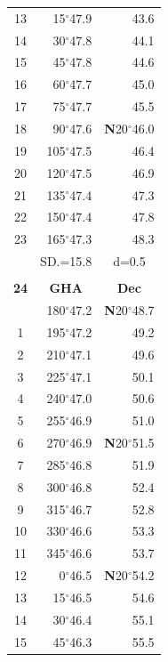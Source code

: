 \documentclass[10pt, a4paper]{report}
\begin{document}
\begin{scriptsize}
\begin{tabular*}{0.2\textwidth}[t]{@{\extracolsep{\fill}}|c|rr|}
13 & 15$^\circ$47.9 & 43.6\\
14 & 30$^\circ$47.8 & 44.1\\
15 & 45$^\circ$47.8 & \raisebox{0.24ex}{\boldmath$\cdot$~\boldmath$\cdot$~~}44.6\\
16 & 60$^\circ$47.7 & 45.0\\
17 & 75$^\circ$47.7 & 45.5\\[2Pt]
18 & 90$^\circ$47.6 & \textbf{N}20$^\circ$46.0\\
19 & 105$^\circ$47.5 & 46.4\\
20 & 120$^\circ$47.5 & 46.9\\
21 & 135$^\circ$47.4 & \raisebox{0.24ex}{\boldmath$\cdot$~\boldmath$\cdot$~~}47.3\\
22 & 150$^\circ$47.4 & 47.8\\
23 & 165$^\circ$47.3 & 48.3\\
\hline
\rule{0pt}{2.4ex} & \multicolumn{1}{c}{SD.=15.8} & \multicolumn{1}{c|}{d=0.5}\\
\hline
\multicolumn{1}{c}{}\\[-0.5ex]\hline
\multicolumn{1}{|c|}{\rule{0pt}{2.6ex}\textbf{24}} & \multicolumn{1}{c}{\textbf{GHA}} & \multicolumn{1}{c|}{\textbf{Dec}}\\
\hline\rule{0pt}{2.6ex}\noindent
0 & 180$^\circ$47.2 & \textbf{N}20$^\circ$48.7\\
1 & 195$^\circ$47.2 & 49.2\\
2 & 210$^\circ$47.1 & 49.6\\
3 & 225$^\circ$47.1 & \raisebox{0.24ex}{\boldmath$\cdot$~\boldmath$\cdot$~~}50.1\\
4 & 240$^\circ$47.0 & 50.6\\
5 & 255$^\circ$46.9 & 51.0\\[2Pt]
6 & 270$^\circ$46.9 & \textbf{N}20$^\circ$51.5\\
7 & 285$^\circ$46.8 & 51.9\\
8 & 300$^\circ$46.8 & 52.4\\
9 & 315$^\circ$46.7 & \raisebox{0.24ex}{\boldmath$\cdot$~\boldmath$\cdot$~~}52.8\\
10 & 330$^\circ$46.6 & 53.3\\
11 & 345$^\circ$46.6 & 53.7\\[2Pt]
12 & 0$^\circ$46.5 & \textbf{N}20$^\circ$54.2\\
13 & 15$^\circ$46.5 & 54.6\\
14 & 30$^\circ$46.4 & 55.1\\
15 & 45$^\circ$46.3 & \raisebox{0.24ex}{\boldmath$\cdot$~\boldmath$\cdot$~~}55.5\\

\end{tabular*}
\end{scriptsize}
\end{document}
